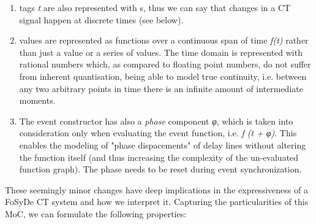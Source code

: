                  \begin{enumerate}
                 \item 
                 tags \emph{t} are also represented with
 s, thus we can say that changes in a
 CT signal happen at discrete times (see below).\par
                 
                 \item 
                 values are represented as functions over a continuous span of
 time \emph{f(t)} rather than just a value or a series of values. The
 time domain is represented with rational numbers which, as
 compared to floating point numbers, do not suffer from inherent
 quantisation, being able to model true continuity, i.e. between
 any two arbitrary points in time there is an infinite amount of
 intermediate moments.\par
                 
                 \item 
                 The event constructor has also a \emph{phase} component \emph{φ},
 which is taken into consideration only when evaluating the event
 function, i.e. \emph{f (t + φ)}. This enables the modeling of
 "phase dispacements" of delay lines without altering the function
 itself (and thus increasing the complexity of the un-evaluated
 function graph). The phase needs to be reset during event
 synchronization.\par
                 
                 \end{enumerate}
                 These seemingly minor changes have deep implications in the
 expressiveness of a FoSyDe CT system and how we interpret
 it. Capturing the particularities of this MoC, we can formulate
 the following properties:\par
                 \par
